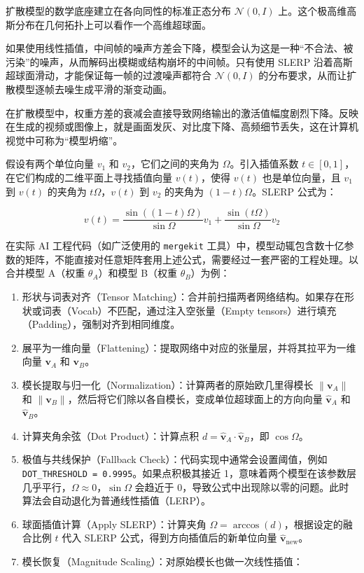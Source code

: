 扩散模型的数学底座建立在各向同性的标准正态分布 \(\mathcal{N}(0,I)\) 上。这个极高维高斯分布在几何拓扑上可以看作一个高维超球面。

如果使用线性插值，中间帧的噪声方差会下降，模型会认为这是一种``不合法、被污染''的噪声，从而解码出模糊或结构崩坏的中间帧。只有使用 SLERP 沿着高斯超球面滑动，才能保证每一帧的过渡噪声都符合 \(\mathcal{N}(0,I)\) 的分布要求，从而让扩散模型逐帧去噪生成平滑的渐变动画。

在扩散模型中，权重方差的衰减会直接导致网络输出的激活值幅度剧烈下降。反映在生成的视频或图像上，就是画面发灰、对比度下降、高频细节丢失，这在计算机视觉中可称为``模型坍缩''。

假设有两个单位向量 \(v_1\) 和 \(v_2\)，它们之间的夹角为 \(\Omega\)。引入插值系数 \(t\in[0,1]\)，在它们构成的二维平面上寻找插值向量 \(v(t)\)，使得 \(v(t)\) 也是单位向量，且 \(v_1\) 到 \(v(t)\) 的夹角为 \(t\Omega\)，\(v(t)\) 到 \(v_2\) 的夹角为 \((1-t)\Omega\)。SLERP 公式为：

\[
v(t)=\frac{\sin((1-t)\Omega)}{\sin\Omega}v_1+\frac{\sin(t\Omega)}{\sin\Omega}v_2
\]

在实际 AI 工程代码（如广泛使用的 \texttt{mergekit} 工具）中，模型动辄包含数十亿参数的矩阵，不能直接对任意矩阵套用上述公式，需要经过一套严密的工程处理。以合并模型 A（权重 \(\theta_A\)）和模型 B（权重 \(\theta_B\)）为例：

\begin{enumerate}
\def\labelenumi{\arabic{enumi}.}
\item
  形状与词表对齐（Tensor Matching）：合并前扫描两者网络结构。如果存在形状或词表（Vocab）不匹配，通过注入空张量（Empty tensors）进行填充（Padding），强制对齐到相同维度。
\item
  展平为一维向量（Flattening）：提取网络中对应的张量层，并将其拉平为一维向量 \(\mathbf{v}_A\) 和 \(\mathbf{v}_B\)。
\item
  模长提取与归一化（Normalization）：计算两者的原始欧几里得模长 \(\|\mathbf{v}_A\|\) 和 \(\|\mathbf{v}_B\|\)，然后将它们除以各自模长，变成单位超球面上的方向向量 \(\hat{\mathbf{v}}_A\) 和 \(\hat{\mathbf{v}}_B\)。
\item
  计算夹角余弦（Dot Product）：计算点积 \(d=\hat{\mathbf{v}}_A\cdot\hat{\mathbf{v}}_B\)，即 \(\cos\Omega\)。
\item
  极值与共线保护（Fallback Check）：代码实现中通常会设置阈值，例如 \texttt{DOT\_THRESHOLD\ =\ 0.9995}。如果点积极其接近 1，意味着两个模型在该参数层几乎平行，\(\Omega\approx 0\)，\(\sin\Omega\) 会趋近于 0，导致公式中出现除以零的问题。此时算法会自动退化为普通线性插值（LERP）。
\item
  球面插值计算（Apply SLERP）：计算夹角 \(\Omega=\arccos(d)\)，根据设定的融合比例 \(t\) 代入 SLERP 公式，得到方向插值后的新单位向量 \(\hat{\mathbf{v}}_{\mathrm{new}}\)。
\item
{}
  模长恢复（Magnitude Scaling）：对原始模长也做一次线性插值：
\end{enumerate}

